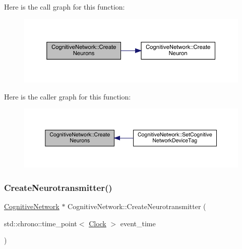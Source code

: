Here is the call graph for this function\+:
\nopagebreak
\begin{figure}[H]
\begin{center}
\leavevmode
\includegraphics[width=350pt]{class_cognitive_network_af9b2a136584c962e44114a7ee3d2804a_cgraph}
\end{center}
\end{figure}
Here is the caller graph for this function\+:
\nopagebreak
\begin{figure}[H]
\begin{center}
\leavevmode
\includegraphics[width=350pt]{class_cognitive_network_af9b2a136584c962e44114a7ee3d2804a_icgraph}
\end{center}
\end{figure}
\mbox{\label{class_cognitive_network_a53d1047ae3ec721540b64b05abe01559}} 
\subsubsection{\texorpdfstring{Create\+Neurotransmitter()}{CreateNeurotransmitter()}}
{\footnotesize\ttfamily \hyperlink{class_cognitive_network}{Cognitive\+Network} $\ast$ Cognitive\+Network\+::\+Create\+Neurotransmitter (\begin{DoxyParamCaption}\item[{std\+::chrono\+::time\+\_\+point$<$ \hyperlink{universe_8h_a0ef8d951d1ca5ab3cfaf7ab4c7a6fd80}{Clock} $>$}]{event\+\_\+time }\end{DoxyParamCaption})}



